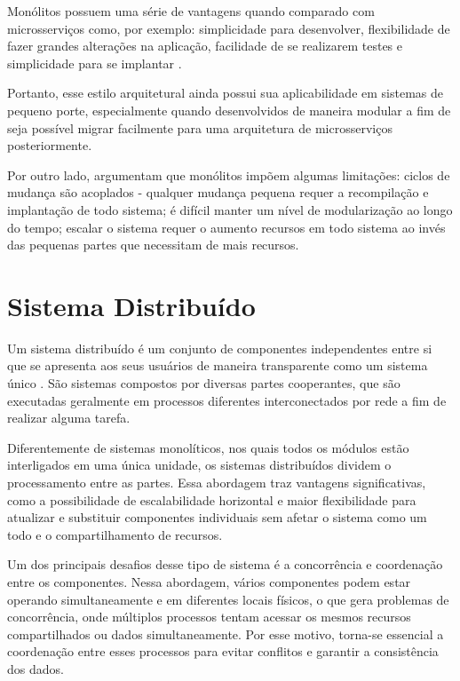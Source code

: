 Monólitos possuem uma série de vantagens quando comparado com microsserviços  como, por exemplo: simplicidade para desenvolver, flexibilidade de fazer grandes alterações na aplicação, facilidade de se realizarem testes e simplicidade para se implantar \cite{richardson2018microservices}.

Portanto, esse estilo arquitetural ainda possui sua aplicabilidade em sistemas de pequeno porte, especialmente quando desenvolvidos de maneira modular a fim de seja possível migrar facilmente para uma arquitetura de microsserviços posteriormente.

Por outro lado,  argumentam que monólitos impõem algumas limitações: ciclos de mudança são acoplados - qualquer mudança pequena requer a recompilação e implantação de todo sistema; é difícil manter um nível de modularização ao longo do tempo; escalar o sistema requer o aumento recursos em todo sistema ao invés das pequenas partes que necessitam de mais recursos.

\section{Sistema Distribuído} 
\label{section:sistemas_distribuidos}

Um sistema distribuído é um conjunto de componentes independentes entre si que se apresenta aos seus usuários de maneira transparente como um sistema único \cite{tanenbaum2010sistemas}. São sistemas compostos por diversas partes cooperantes, que são executadas geralmente em processos diferentes interconectados por rede a fim de realizar alguma tarefa. 

Diferentemente de sistemas monolíticos, nos quais todos os módulos estão interligados em uma única unidade, os sistemas distribuídos dividem o processamento entre as partes. Essa abordagem traz vantagens significativas, como a possibilidade de escalabilidade horizontal e maior flexibilidade para atualizar e substituir componentes individuais sem afetar o sistema como um todo e o compartilhamento de recursos.

Um dos principais desafios desse tipo de sistema é a concorrência e coordenação entre os componentes. Nessa abordagem, vários componentes podem estar operando simultaneamente e em diferentes locais físicos, o que gera problemas de concorrência, onde múltiplos processos tentam acessar os mesmos recursos compartilhados ou dados simultaneamente. Por esse motivo, torna-se essencial a coordenação entre esses processos para evitar conflitos e garantir a consistência dos dados.

